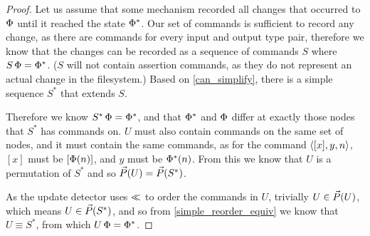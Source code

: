 \begin{proof}
Let us assume that some mechanism recorded all changes that occurred
to $\Phi$ until it reached the state $\Phi^*$.
Our set of commands is sufficient to record any change, as
there are commands for every input and output type pair, therefore
we know that the changes can be recorded as a sequence of commands $S$
where $S\,\Phi=\Phi^*$.
($S$ will not contain assertion commands, as they do not
represent an actual change in the filesystem.)
Based on \cref{can_simplify}, there is a simple sequence $S^*$
that extends $S$.

Therefore we know $S^*\,\Phi=\Phi^*$, and that
$\Phi^*$ and $\Phi$ differ at exactly those nodes that $S^*$ has commands on.
$U$ must also contain commands on the same set of nodes,
and it must contain the same commands,
as for the command $\langle{[x],y,n}\rangle$, $[x]$ must be $[\Phi(n)]$, and $y$ must be $\Phi^*(n)$.
From this we know that $U$ is a permutation of $S^*$ and so $\vec{P}({U})=\vec{P}({S^*})$.

As the update detector uses $\ll$ to order the commands in $U$, trivially $U\in\vec{P}({U})$,
which means $U\in\vec{P}({S^*})$,
and so from \cref{simple_reorder_equiv} we know that $U\equiv S^*$,
from which $U\,\Phi=\Phi^*$.
\end{proof}
